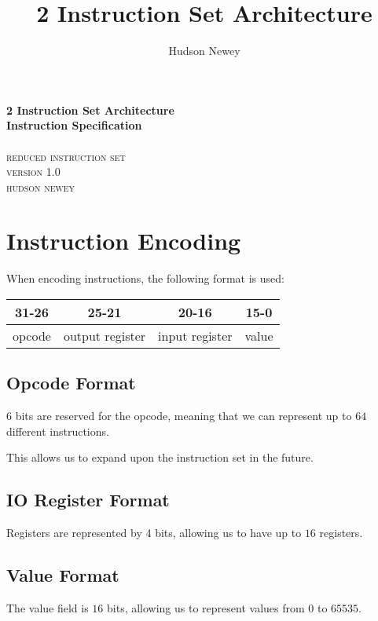 \documentclass[12pt,a4paper]{article}
\title{ 2 Instruction Set Architecture }
\author{ Hudson Newey }
\begin{document}
\begin{center}
    \huge{\textbf{ 2 Instruction Set Architecture }} \\
    \huge{\textbf{ Instruction Specification }}\\
    \hspace{200pt}\\
    \textsc{ reduced instruction set } \\
    \textsc{ version 1.0 }
    \vspace{280pt}\\
    \textsc{ hudson newey }
\end{center}

\newpage
\tableofcontents
\newpage

\section{Instruction Encoding}

When encoding instructions, the following format is used:

\begin{center}
\begin{tabular}{ c c c c }
    \textbf{31-26} & \textbf{25-21} & \textbf{20-16} & \textbf{15-0} \\
    \hline
    opcode & output register & input register & value \\
\end{tabular}
\end{center}

\subsection{Opcode Format}

$6$ bits are reserved for the opcode, meaning that we can represent up to $64$
different instructions.

This allows us to expand upon the instruction set in the future.

\subsection{IO Register Format}

Registers are represented by 4 bits, allowing us to have up to $16$ registers.

\subsection{Value Format}

The value field is $16$ bits, allowing us to represent values from $0$ to
$65535$.
\end{document}

